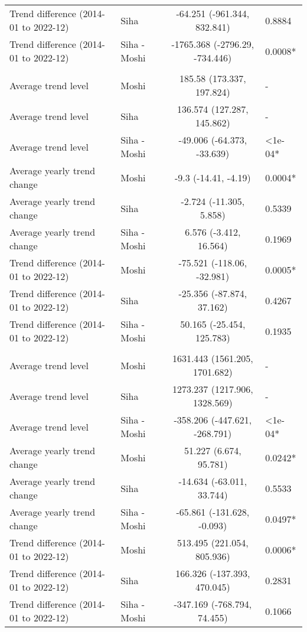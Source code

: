 \begin{longtable}{l|lcl}
Trend difference (2014-01 to 2022-12) & Siha & -64.251 (-961.344, 832.841) & 0.8884 \\ 
Trend difference (2014-01 to 2022-12) & Siha - Moshi & -1765.368 (-2796.29, -734.446) & 0.0008* \\ 
\midrule\addlinespace[2.5pt]
\multicolumn{4}{l}{Trauma} \\ 
\midrule\addlinespace[2.5pt]
Average trend level & Moshi & 185.58 (173.337, 197.824) & - \\ 
Average trend level & Siha & 136.574 (127.287, 145.862) & - \\ 
Average trend level & Siha - Moshi & -49.006 (-64.373, -33.639) & <1e-04* \\ 
Average yearly trend change & Moshi & -9.3 (-14.41, -4.19) & 0.0004* \\ 
Average yearly trend change & Siha & -2.724 (-11.305, 5.858) & 0.5339 \\ 
Average yearly trend change & Siha - Moshi & 6.576 (-3.412, 16.564) & 0.1969 \\ 
Trend difference (2014-01 to 2022-12) & Moshi & -75.521 (-118.06, -32.981) & 0.0005* \\ 
Trend difference (2014-01 to 2022-12) & Siha & -25.356 (-87.874, 37.162) & 0.4267 \\ 
Trend difference (2014-01 to 2022-12) & Siha - Moshi & 50.165 (-25.454, 125.783) & 0.1935 \\ 
\midrule\addlinespace[2.5pt]
\multicolumn{4}{l}{Urinary Infections} \\ 
\midrule\addlinespace[2.5pt]
Average trend level & Moshi & 1631.443 (1561.205, 1701.682) & - \\ 
Average trend level & Siha & 1273.237 (1217.906, 1328.569) & - \\ 
Average trend level & Siha - Moshi & -358.206 (-447.621, -268.791) & <1e-04* \\ 
Average yearly trend change & Moshi & 51.227 (6.674, 95.781) & 0.0242* \\ 
Average yearly trend change & Siha & -14.634 (-63.011, 33.744) & 0.5533 \\ 
Average yearly trend change & Siha - Moshi & -65.861 (-131.628, -0.093) & 0.0497* \\ 
Trend difference (2014-01 to 2022-12) & Moshi & 513.495 (221.054, 805.936) & 0.0006* \\ 
Trend difference (2014-01 to 2022-12) & Siha & 166.326 (-137.393, 470.045) & 0.2831 \\ 
Trend difference (2014-01 to 2022-12) & Siha - Moshi & -347.169 (-768.794, 74.455) & 0.1066 \\ 

\end{longtable}
